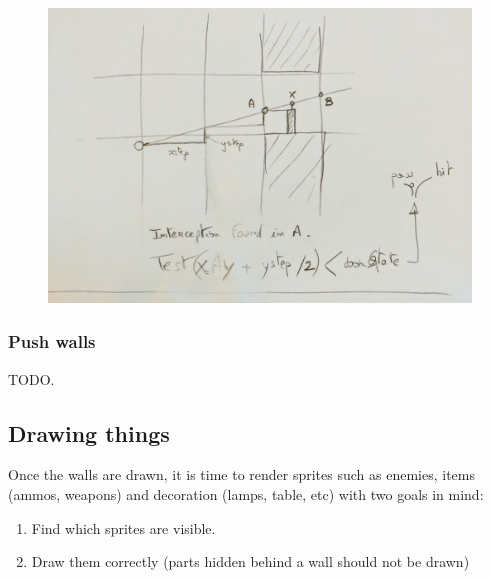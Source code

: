 \begin{minipage}{\textwidth}

\end{minipage}

\par 
 \par
\begin{figure}[H]
  \centering
 \includegraphics[width=\textwidth]{imgs/drawings/test_door.png}
\end{figure}
\par












\subsubsection{Push walls} 
TODO.\\


















\subsection{Drawing things}
Once the walls are drawn, it is time to render sprites such as enemies, items (ammos, weapons) and decoration (lamps, table, etc) with two goals in mind:
 \begin{enumerate}
  \item Find which sprites are visible.
  \item Draw them correctly (parts hidden behind a wall should not be drawn)
 \end{enumerate}



